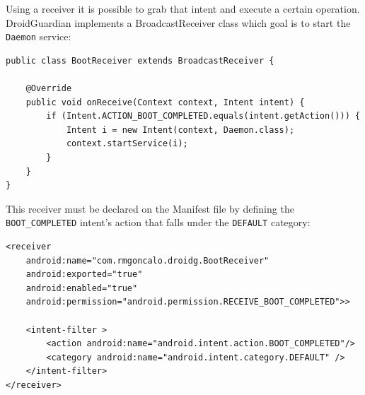 Using a receiver it is possible to grab that intent and execute a certain operation. DroidGuardian implements a BroadcastReceiver class which goal is to start the \texttt{Daemon} service:

\begin{lstlisting}[caption=BroadcastReceiver responsible to start the service after the booting process]
public class BootReceiver extends BroadcastReceiver {
	
    @Override
    public void onReceive(Context context, Intent intent) {
        if (Intent.ACTION_BOOT_COMPLETED.equals(intent.getAction())) {
            Intent i = new Intent(context, Daemon.class);
            context.startService(i);
        }
    }
}
\end{lstlisting}

This receiver must be declared on the Manifest file by defining the \texttt{BOOT\_COMPLETED} intent's action that falls under the \texttt{DEFAULT} category:

\begin{lstlisting}[caption=Declaring the receiver component on the Manifest file]
 <receiver 
    android:name="com.rmgoncalo.droidg.BootReceiver"
    android:exported="true"
    android:enabled="true"
    android:permission="android.permission.RECEIVE_BOOT_COMPLETED">>
    
    <intent-filter >
        <action android:name="android.intent.action.BOOT_COMPLETED"/>
        <category android:name="android.intent.category.DEFAULT" />
    </intent-filter>
</receiver>
\end{lstlisting}